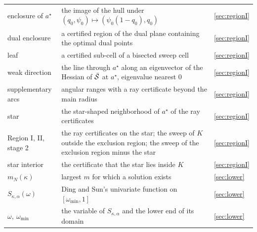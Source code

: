 \begin{longtable}{p{}p{}p{}}
enclosure of $a^\star$ & the image of the hull under $(q_0,\psi_0)\mapsto(\psi_0(1-q_0),q_0)$ & \ref{sec:regionI}\\
dual enclosure & a certified region of the dual plane containing the optimal dual points & \ref{sec:regionI}\\
leaf & a certified sub-cell of a bisected sweep cell & \ref{sec:regionI}\\
weak direction & the line through $a^\star$ along an eigenvector of the Hessian of $\bar{\mathcal{S}}$ at $a^\star$, eigenvalue nearest $0$ & \ref{sec:regionI}\\
supplementary arcs & angular ranges with a ray certificate beyond the main radius & \ref{sec:regionI}\\
star & the star-shaped neighborhood of $a^\star$ of the ray certificates & \ref{sec:regionI}\\
Region I, II, stage 2 & the ray certificates on the star; the sweep of $K$ outside the exclusion region; the sweep of the exclusion region minus the star & \ref{sec:regionI}\\
star interior & the certificate that the star lies inside $K$ & \ref{sec:regionI}\\
$m_N(\kappa)$ & largest $m$ for which a solution exists & \ref{sec:lower}\\
$S_{\kappa,\alpha}(\omega)$ & Ding and Sun's univariate function on $[\omega_{\min},1]$ & \ref{sec:lower}\\
$\omega,\ \omega_{\min}$ & the variable of $S_{\kappa,\alpha}$ and the lower end of its domain & \ref{sec:lower}\\
\end{longtable}
